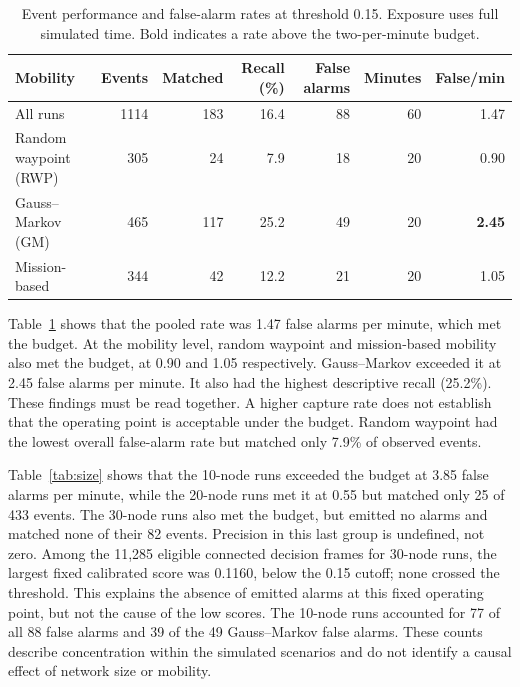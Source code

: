 \documentclass[10pt,a4paper]{article}
\begin{document}
\begin{table}[ht]
\caption{Event performance and false-alarm rates at threshold 0.15. Exposure uses full simulated time. Bold indicates a rate above the two-per-minute budget.}\label{tab:main}
\centering
\setlength{\tabcolsep}{3.5pt}
\begin{tabular}{lrrrrrr}
\toprule
Mobility & Events & Matched & Recall (\%) & False alarms & Minutes & False/min \\
\midrule
All runs & 1114 & 183 & 16.4 & 88 & 60 & 1.47 \\
Random waypoint (RWP) & 305 & 24 & 7.9 & 18 & 20 & 0.90 \\
Gauss--Markov (GM) & 465 & 117 & 25.2 & 49 & 20 & \textbf{2.45} \\
Mission-based & 344 & 42 & 12.2 & 21 & 20 & 1.05 \\
\bottomrule
\end{tabular}
\end{table}

Table~\ref{tab:main} shows that the pooled rate was 1.47 false alarms per minute, which met the budget. At the mobility level, random waypoint and mission-based mobility also met the budget, at 0.90 and 1.05 respectively. Gauss--Markov exceeded it at 2.45 false alarms per minute. It also had the highest descriptive recall (25.2\%). These findings must be read together. A higher capture rate does not establish that the operating point is acceptable under the budget. Random waypoint had the lowest overall false-alarm rate but matched only 7.9\% of observed events.

Table~\ref{tab:size} shows that the 10-node runs exceeded the budget at 3.85 false alarms per minute, while the 20-node runs met it at 0.55 but matched only 25 of 433 events. The 30-node runs also met the budget, but emitted no alarms and matched none of their 82 events. Precision in this last group is undefined, not zero. Among the 11,285 eligible connected decision frames for 30-node runs, the largest fixed calibrated score was 0.1160, below the 0.15 cutoff; none crossed the threshold. This explains the absence of emitted alarms at this fixed operating point, but not the cause of the low scores. The 10-node runs accounted for 77 of all 88 false alarms and 39 of the 49 Gauss--Markov false alarms. These counts describe concentration within the simulated scenarios and do not identify a causal effect of network size or mobility.
\end{document}
